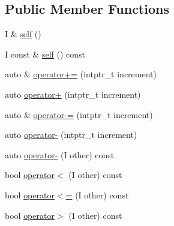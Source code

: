 \subsection*{Public Member Functions}
\begin{DoxyCompactItemize}
\item 
I \& \mbox{\hyperlink{struct_r_a_h___n_a_m_e_s_p_a_c_e_1_1iterator__facade_3_01_i_00_01_r_00_01std_1_1random__access__iterator__tag_01_4_a61ead17430defe331e283a88cc2a3209}{self}} ()
\item 
I const  \& \mbox{\hyperlink{struct_r_a_h___n_a_m_e_s_p_a_c_e_1_1iterator__facade_3_01_i_00_01_r_00_01std_1_1random__access__iterator__tag_01_4_a8c7928101d4d7859bb954da23696628e}{self}} () const
\item 
auto \& \mbox{\hyperlink{struct_r_a_h___n_a_m_e_s_p_a_c_e_1_1iterator__facade_3_01_i_00_01_r_00_01std_1_1random__access__iterator__tag_01_4_aff97504096ea2d4df8df3845072c742a}{operator+=}} (intptr\+\_\+t increment)
\item 
auto \mbox{\hyperlink{struct_r_a_h___n_a_m_e_s_p_a_c_e_1_1iterator__facade_3_01_i_00_01_r_00_01std_1_1random__access__iterator__tag_01_4_acabfa0b0c9d15114d69f231eb7dd4103}{operator+}} (intptr\+\_\+t increment)
\item 
auto \& \mbox{\hyperlink{struct_r_a_h___n_a_m_e_s_p_a_c_e_1_1iterator__facade_3_01_i_00_01_r_00_01std_1_1random__access__iterator__tag_01_4_aed0971e08aa866b9f9a320d3425100cc}{operator-\/=}} (intptr\+\_\+t increment)
\item 
auto \mbox{\hyperlink{struct_r_a_h___n_a_m_e_s_p_a_c_e_1_1iterator__facade_3_01_i_00_01_r_00_01std_1_1random__access__iterator__tag_01_4_a78d32b3dabe7efb4ce0c259809de7ad7}{operator-\/}} (intptr\+\_\+t increment)
\item 
auto \mbox{\hyperlink{struct_r_a_h___n_a_m_e_s_p_a_c_e_1_1iterator__facade_3_01_i_00_01_r_00_01std_1_1random__access__iterator__tag_01_4_a42aa0c20016f701bd29fdcd043f45453}{operator-\/}} (I other) const
\item 
bool \mbox{\hyperlink{struct_r_a_h___n_a_m_e_s_p_a_c_e_1_1iterator__facade_3_01_i_00_01_r_00_01std_1_1random__access__iterator__tag_01_4_a923112d4c6c8830b815c58084ac2df41}{operator$<$}} (I other) const
\item 
bool \mbox{\hyperlink{struct_r_a_h___n_a_m_e_s_p_a_c_e_1_1iterator__facade_3_01_i_00_01_r_00_01std_1_1random__access__iterator__tag_01_4_aac5d04677e6ca5647960f65f6cbff22d}{operator$<$=}} (I other) const
\item 
bool \mbox{\hyperlink{struct_r_a_h___n_a_m_e_s_p_a_c_e_1_1iterator__facade_3_01_i_00_01_r_00_01std_1_1random__access__iterator__tag_01_4_a9fa2c870804296896c00b3d61bad3066}{operator$>$}} (I other) const

\end{DoxyCompactItemize}
